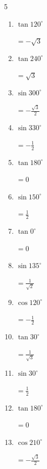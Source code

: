 \begin{multicols}{5}
\begin{enumerate}
  \item $\displaystyle \tan{120^\circ}$

        $\displaystyle =-\sqrt{3}$

\columnbreak %

  \item $\displaystyle \tan{240^\circ}$

        $\displaystyle =\sqrt{3}$

  \item $\displaystyle \sin{300^\circ}$

        $\displaystyle =-\frac{\sqrt{3}}{2}$

  \item $\displaystyle \sin{330^\circ}$

        $\displaystyle =-\frac{1}{2}$

  \item $\displaystyle \tan{180^\circ}$

        $\displaystyle =0$

  \item $\displaystyle \sin{150^\circ}$

        $\displaystyle =\frac{1}{2}$

  \item $\displaystyle \tan{0^\circ}$

        $\displaystyle =0$

  \item $\displaystyle \sin{135^\circ}$

        $\displaystyle =\frac{1}{\sqrt{2}}$

  \item $\displaystyle \cos{120^\circ}$

        $\displaystyle =-\frac{1}{2}$

  \item $\displaystyle \tan{30^\circ}$

        $\displaystyle =\frac{1}{\sqrt{3}}$

  \item $\displaystyle \sin{30^\circ}$

        $\displaystyle =\frac{1}{2}$

  \item $\displaystyle \tan{180^\circ}$

        $\displaystyle =0$

  \item $\displaystyle \cos{210^\circ}$

        $\displaystyle =-\frac{\sqrt{3}}{2}$


\end{enumerate}
\end{multicols}
